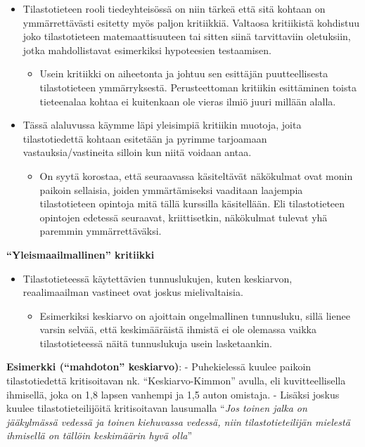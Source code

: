 \documentclass[
]{book}
\providecommand{\tightlist}{%
  \setlength{\itemsep}{0pt}\setlength{\parskip}{0pt}}
\begin{document}
\begin{itemize}
\tightlist
\item
  Tilastotieteen rooli tiedeyhteisössä on niin tärkeä että sitä kohtaan on ymmärrettävästi esitetty myös paljon kritiikkiä. Valtaosa kritiikistä kohdistuu joko tilastotieteen matemaattisuuteen tai sitten siinä tarvittaviin oletuksiin, jotka mahdollistavat esimerkiksi hypoteesien testaamisen.

  \begin{itemize}
  \tightlist
  \item
    Usein kritiikki on aiheetonta ja johtuu sen esittäjän puutteellisesta tilastotieteen ymmärryksestä. Perusteettoman kritiikin esittäminen toista tieteenalaa kohtaa ei kuitenkaan ole vieras ilmiö juuri millään alalla.
  \end{itemize}
\item
  Tässä alaluvussa käymme läpi yleisimpiä kritiikin muotoja, joita tilastotiedettä kohtaan esitetään ja pyrimme tarjoamaan vastauksia/vastineita silloin kun niitä voidaan antaa.

  \begin{itemize}
  \tightlist
  \item
    On syytä korostaa, että seuraavassa käsiteltävät näkökulmat ovat monin paikoin sellaisia, joiden ymmärtämiseksi vaaditaan laajempia tilastotieteen opintoja mitä tällä kurssilla käsitellään. Eli tilastotieteen opintojen edetessä seuraavat, kriittisetkin, näkökulmat tulevat yhä paremmin ymmärrettäväksi.
  \end{itemize}
\end{itemize}

\hfill\break
\hfill\break

\textbf{``Yleismaailmallinen'' kritiikki}

\begin{itemize}
\tightlist
\item
  Tilastotieteessä käytettävien tunnuslukujen, kuten keskiarvon, reaalimaailman vastineet ovat joskus mielivaltaisia.

  \begin{itemize}
  \tightlist
  \item
    Esimerkiksi keskiarvo on ajoittain ongelmallinen tunnusluku, sillä lienee varsin selvää, että keskimääräistä ihmistä ei ole olemassa vaikka tilastotieteessä näitä tunnuslukuja usein lasketaankin.
  \end{itemize}
\end{itemize}

\begin{eblock}{}
\textbf{Esimerkki (``mahdoton'' keskiarvo)}:
- Puhekielessä kuulee paikoin tilastotiedettä kritisoitavan nk. ``Keskiarvo-Kimmon'' avulla, eli kuvitteellisella ihmisellä, joka on 1,8 lapsen vanhempi ja 1,5 auton omistaja.
- Lisäksi joskus kuulee tilastotieteilijöitä kritisoitavan lausumalla ``\emph{Jos toinen jalka on jääkylmässä vedessä ja toinen kiehuvassa vedessä, niin tilastotieteilijän mielestä ihmisellä on tällöin keskimäärin hyvä olla}''

\end{eblock}
\end{document}
